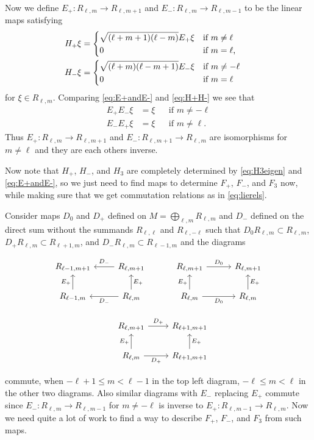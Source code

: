 Now we define $E_+ \colon R_{\ell,m}\to R_{\ell,m+1}$ and $E_- \colon R_{\ell,m}\to R_{\ell,m-1}$ to be the linear maps satisfying
\begin{align}
  \begin{split} \label{eq:E+andE-}
    H_+ \xi &=
    \begin{dcases*}
      \sqrt{(\ell+m+1)(\ell-m)}E_+\xi & if $m\neq \ell$ \\
      0 & if $m=\ell$,
    \end{dcases*} \\
    H_- \xi &=
    \begin{dcases*}
      \sqrt{(\ell+m)(\ell-m+1)}E_-\xi & if $m\neq -\ell$ \\
      0 & if $m=\ell$
    \end{dcases*}
  \end{split}
\end{align}
for $\xi\in R_{\ell,m}$. Comparing \cref{eq:E+andE-} and \cref{eq:H+H-} we see that
\begin{align*}
  E_+E_-\xi &= \xi && \mbox{if }m\neq-\ell \\
  E_-E_+\xi &= \xi && \mbox{if }m\neq\ell.
\end{align*}
Thus $E_+\colon R_{\ell,m}\to R_{\ell,m+1}$ and $E_-\colon R_{\ell,m+1}\to R_{\ell,m}$ are isomorphisms for $m\neq\ell$ and they are each others inverse. 

Now note that $H_+$, $H_-$, and $H_3$ are completely determined by \cref{eq:H3eigen} and \cref{eq:E+andE-}, so we just need to find maps to determine $F_+$, $F_-$, and $F_3$ now, while making sure that we get commutation relations as in \cref{eq:lierels}.

Consider maps $D_0$ and $D_+$ defined on $M=\bigoplus_{\ell,m} R_{\ell,m}$ and $D_-$ defined on the direct sum without the summands $R_{\ell,\ell}$ and $R_{\ell,-\ell}$ such that $D_0 R_{\ell,m}\subset R_{\ell,m}$, $D_+ R_{\ell,m} \subset R_{\ell+1,m}$, and $D_- R_{\ell,m} \subset R_{\ell-1,m}$ and the diagrams
\begin{center}
  \begin{equation}\label{eq:Ddiagrams}
    \begin{tikzcd}[baseline=(current bounding box.center)]
      R_{\ell-1,m+1} & R_{\ell,m+1} \ar[l,"D_-",swap] & R_{\ell,m+1} \ar[r,"D_0"] & R_{\ell,m+1}  \\
      R_{\ell-1,m} \ar[u,"E_+"] & R_{\ell,m} \ar[l,"D_-"] \ar[u,"E_+",swap] & R_{\ell,m} \ar[r,"D_0",swap] \ar[u,"E_+"] & R_{\ell,m} \ar[u,"E_+",swap] \\
      & R_{\ell,m+1} \ar[r,"D_+"] & R_{\ell+1,m+1} \\
      & R_{\ell,m} \ar[u,"E_+"] \ar[r,"D_+",swap] & R_{\ell+1,m+1} \ar[u,"E_+",swap]
    \end{tikzcd}
  \end{equation}
\end{center}
commute, when $-\ell+1\leq m < \ell-1$ in the top left diagram, $-\ell\leq m<\ell$ in the other two diagrams. Also similar diagrams with $E_-$ replacing $E_+$ commute since $E_-\colon R_{\ell,m}\to R_{\ell,m-1}$ for $m\neq -\ell$ is inverse to $E_+\colon R_{\ell,m-1}\to R_{\ell,m}$. Now we need quite a lot of work to find a way to describe $F_+$, $F_-$, and $F_3$ from such maps.

